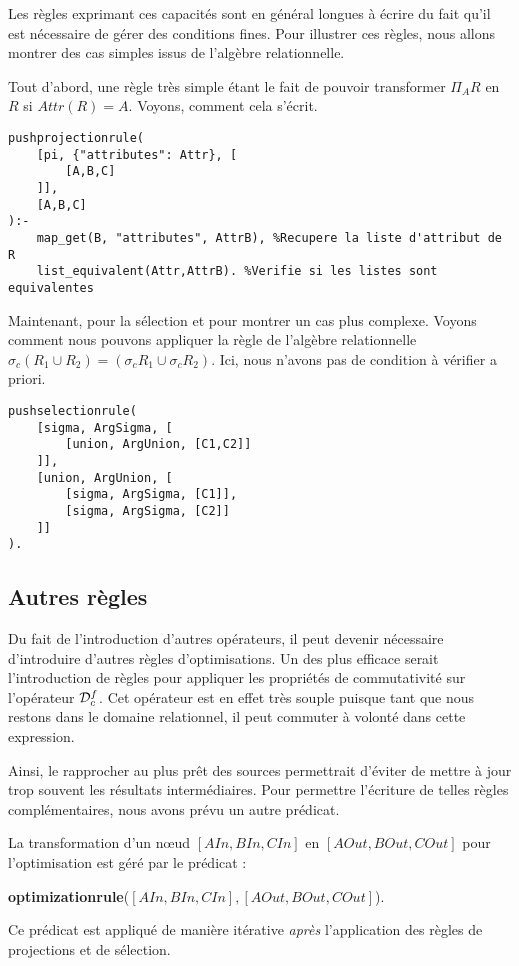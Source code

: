 Les règles exprimant ces capacités sont en général longues à écrire du fait qu'il est nécessaire de gérer des conditions fines. Pour illustrer ces règles, nous allons montrer des cas simples issus de l'algèbre relationnelle.
\begin{example}
	Tout d'abord, une règle très simple étant le fait de pouvoir transformer $\Pi_A R$ en $R$ si $Attr(R)=A$. Voyons, comment cela s'écrit.
	\begin{lstlisting}
pushprojectionrule(
    [pi, {"attributes": Attr}, [
        [A,B,C]
    ]],
    [A,B,C]
):-
    map_get(B, "attributes", AttrB), %Recupere la liste d'attribut de R
    list_equivalent(Attr,AttrB). %Verifie si les listes sont equivalentes
	\end{lstlisting}
	
	Maintenant, pour la sélection et pour montrer un cas plus complexe. Voyons comment nous pouvons appliquer la règle de l'algèbre relationnelle $\sigma_c (R_1 \cup R_2) = (\sigma_c R_1 \cup \sigma_c R_2)$. Ici, nous n'avons pas de condition à vérifier a priori.
	\begin{lstlisting}
pushselectionrule(
    [sigma, ArgSigma, [
        [union, ArgUnion, [C1,C2]]
    ]],
    [union, ArgUnion, [
        [sigma, ArgSigma, [C1]], 
        [sigma, ArgSigma, [C2]]
    ]]
).
	\end{lstlisting}
\end{example}

\subsection{Autres règles}
Du fait de l'introduction d'autres opérateurs, il peut devenir nécessaire d'introduire d'autres règles d'optimisations. Un des plus efficace serait l'introduction de règles pour appliquer les propriétés de commutativité sur l'opérateur $\mathcal{D}_c^f$. Cet opérateur est en effet très souple puisque tant que nous restons dans le domaine relationnel, il peut commuter à volonté dans cette expression.

Ainsi, le rapprocher au plus prêt des sources permettrait d'éviter de mettre à jour trop souvent les résultats intermédiaires. Pour permettre l'écriture de telles règles complémentaires, nous avons prévu un autre prédicat.
\begin{regle}
La transformation d'un nœud $[AIn,BIn,CIn]$ en $[AOut,BOut,COut]$ pour l'optimisation est géré par le prédicat :
\begin{center} \textbf{optimizationrule}($[AIn,BIn,CIn],[AOut,BOut,COut]$).\end{center}
Ce prédicat est appliqué de manière itérative \textit{après} l'application des règles de projections et de sélection.
\end{regle}


